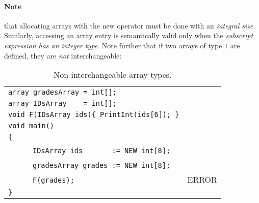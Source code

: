 \documentclass{article}
\begin{document}
\paragraph{Note} that allocating arrays with the new operator
must be done with an \textit{integral size}.
Similarly, accessing an array entry is semantically valid
only when the \textit{subscript expression has an integer type}.
Note further that if two arrays of type \verb"T" are defined,
they are \textit{not} interchangeable:
\begin{table}[h]
\centering
\begin{tabular}{ | l | l | }
\hline
\verb"array gradesArray = int[];"                 &       \\
\verb"array IDsArray    = int[];"                 &       \\
\verb"void F(IDsArray ids){ PrintInt(ids[6]); }" &       \\
\verb"void main()"                               &       \\
\verb"{"                                         &       \\
~ ~ ~ ~\verb"IDsArray ids       := NEW int[8];"  &       \\
~ ~ ~ ~\verb"gradesArray grades := NEW int[8];"  &       \\
~ ~ ~ ~\verb"F(grades);"                         & ERROR \\
\verb"}"                                         &       \\
\hline
\end{tabular}
\caption{Non interchangeable array types.
\label{Table_Code_Examples_nil_Instead_Of_Any_Array}}
\end{table}  
\end{document}
